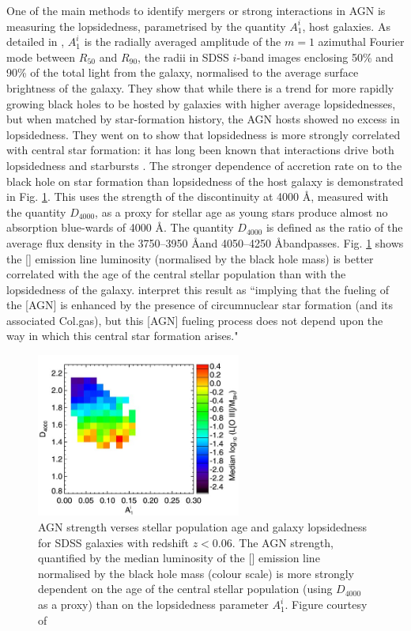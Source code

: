 			One of the main methods to identify mergers or strong interactions in AGN is measuring the lopsidedness, parametrised by the quantity $A_1^i$, host galaxies. As detailed in \citet{Reichard2008}, $A_1^i$ is the radially averaged amplitude of the $m=1$ azimuthal Fourier mode between $R_\mathrm{50}$ and $R_\mathrm{90}$, the radii in SDSS $i$-band images enclosing 50\% and 90\% of the total light from the galaxy, normalised to the average surface brightness of the galaxy. They show that while there is a trend for more rapidly growing black holes to be hosted by galaxies with higher average lopsidednesses, but when matched by star-formation history, the AGN hosts showed no excess in lopsidedness. They went on to show that lopsidedness is more strongly correlated with central star formation: it has long been known that interactions drive both lopsidedness and starbursts \citep[e.g.][]{Larson1978}. The stronger dependence of accretion rate on to the black hole on star formation than lopsidedness of the host galaxy is demonstrated in Fig. \ref{fig:anisotropy}. This uses the strength of the discontinuity at 4000 \AA, measured with the quantity $D_\mathrm{4000}$, as a proxy for stellar age as young stars produce almost no absorption blue-wards of 4000 \AA. The quantity $D_\mathrm{4000}$ is defined as the ratio of the average flux density in the 3750--3950 \AA and 4050--4250 \AA bandpasses. Fig. \ref{fig:anisotropy} shows the [] emission line luminosity (normalised by the black hole mass) is better correlated with the age of the central stellar population than with the lopsidedness of the galaxy. \citet{Heckman2014} interpret this result as ``implying that the fueling of the [AGN] is enhanced by the presence of circumnuclear star formation (and its associated Col.gas), but this [AGN] fueling process does not depend upon the way in which this central star formation arises."

			\begin{figure}
				\centering
				\includegraphics[width=0.6\textwidth]{introduction/age_anisotropy.jpg}
				\caption[The dependence of AGN on age and anisotropies]{AGN strength verses stellar population age and galaxy lopsidedness for SDSS galaxies with redshift $z<0.06$. The AGN strength, quantified by the median luminosity of the [] emission line normalised by the black hole mass (colour scale) is more strongly dependent on the age of the central stellar population (using $D_\mathrm{4000}$ as a proxy) than on the lopsidedness parameter $A_1^i$. Figure courtesy of \citet{Reichard2009}}
				\label{fig:anisotropy}
			\end{figure}

